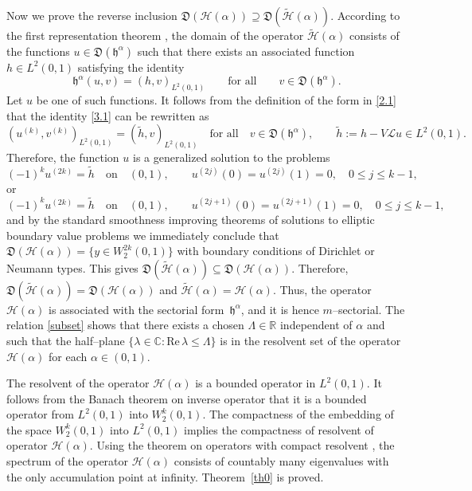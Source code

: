 \documentclass[11pt,centertags,reqno,twoside]{amsart}
\numberwithin{equation}{section}
\theoremstyle{definition}
\theoremstyle{remark}
\begin{document}
Now we prove the reverse inclusion $\mathfrak{D}(\mathcal{H}(\alpha))\supseteq
\mathfrak{D}(\widetilde{\mathcal{H}}(\alpha))$. According to the first representation
theorem \cite[Ch. V\!I, Sect.~2.1, Thm.~2.1]{Kato}, the domain of the operator
$\widetilde{\mathcal{H}}(\alpha)$ consists of the functions
$u\in\mathfrak{D}(\mathfrak{h}^\alpha)$ such that there exists an associated
function $h\in L^2(0, 1)$ satisfying the identity
\begin{equation}\label{3.1}
\mathfrak{h}^\alpha(u, v)=(h, v)_{L^2(0, 1)}\qquad\text{for all}\qquad
v\in\mathfrak{D}(\mathfrak{h}^\alpha).
\end{equation}
Let $u$ be one of such functions. It follows from the definition of the form
in \eqref{2.1} that the identity \eqref{3.1} can be rewritten as
\[
(u^{(k)}, v^{(k)})_{L^2(0, 1)}=(\widetilde{h}, v)_{L^2(0, 1)}\quad\text{for all}
\quad v\in\mathfrak{D}(\mathfrak{h}^\alpha),\qquad
\widetilde{h}:=h-V\mathcal{L}u\in L^2(0, 1).
\]
Therefore, the function $u$ is a generalized solution to the problems
\[
(-1)^ku^{(2k)}=\widetilde{h} \quad \text{on} \quad (0, 1), \qquad u^{(2j)}(0)=u^{(2j)}(1)=0,
\quad 0\leqslant j\leqslant k-1,
\]
or
\[
(-1)^ku^{(2k)}=\widetilde{h} \quad \text{on} \quad (0, 1),
\qquad u^{(2j+1)}(0)=u^{(2j+1)}(1)=0,
\quad 0\leqslant j\leqslant k-1,
\]
and by the standard smoothness improving theorems of solutions
to elliptic boundary value problems we immediately conclude that
$\mathfrak{D}(\mathcal{H}(\alpha))=\{y\in W^{2k}_2(0, 1)\}$ with
boundary conditions of Dirichlet or Neumann types. This gives
$\mathfrak{D}(\widetilde{\mathcal{H}}(\alpha))\subseteq
\mathfrak{D}(\mathcal{H}(\alpha))$. Therefore,
$\mathfrak{D}(\widetilde{\mathcal{H}}(\alpha))
=\mathfrak{D}(\mathcal{H}(\alpha))$ and
$\widetilde{\mathcal{H}}(\alpha)=\mathcal{H}(\alpha)$. Thus, the operator
$\mathcal{H}(\alpha)$ is associated with the sectorial form~$\mathfrak{h}^\alpha$,
and it is hence $m$--sectorial. The relation \eqref{subset} shows that there exists
a chosen $\Lambda\in\mathbb{R}$ independent of $\alpha$ and such that the
half--plane $\{\lambda\in\mathbb{C}: \mathrm{Re}\,\lambda\leqslant\Lambda\}$
is in the resolvent set of the operator $\mathcal{H}(\alpha)$ for each $\alpha\in (0, 1)$.

The resolvent of the operator $\mathcal{H}(\alpha)$ is a bounded operator in
$L^2(0, 1)$. It follows from the Banach theorem on inverse operator that it is a
bounded operator from $L^2(0, 1)$ into $W_2^k(0, 1)$. The compactness of the
embedding of the space  $W_2^k(0, 1)$ into $L^2(0, 1)$ implies the
compactness of  resolvent of operator $\mathcal{H}(\alpha)$.
Using the theorem on operators with compact resolvent
\cite[Ch.~3, Sect.~6.8, Thm.~6.29]{Kato}, the spectrum of the operator
$\mathcal{H}(\alpha)$ consists of countably many eigenvalues
with the only accumulation point at infinity. Theorem~\ref{th0} is proved.
\end{document}
